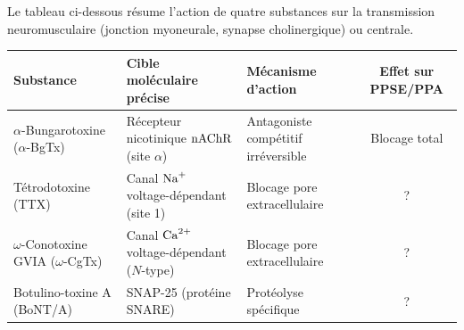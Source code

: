 \documentclass[11pt]{article}
\begin{document}
\begin{exercice}
Le tableau ci-dessous résume l'action de quatre substances sur la transmission neuromusculaire (jonction myoneurale, synapse cholinergique) ou centrale.

\begin{center}
\begin{tabular}{|l|l|l|c|}
\hline
\textbf{Substance} & \textbf{Cible moléculaire précise} & \textbf{Mécanisme d'action} & \textbf{Effet sur PPSE/PPA} \\
\hline
$\alpha$-Bungarotoxine ($\alpha$-BgTx) & Récepteur nicotinique $\ce{nAChR}$ (site $\alpha$) & Antagoniste compétitif irréversible & Blocage total \\
Tétrodotoxine (TTX) & Canal $\ce{Na+}$ voltage-dépendant (site 1) & Blocage pore extracellulaire & ? \\
$\omega$-Conotoxine GVIA ($\omega$-CgTx) & Canal $\ce{Ca^{2+}}$ voltage-dépendant ($N$-type) & Blocage pore extracellulaire & ? \\
Botulino-toxine A (BoNT/A) & SNAP-25 (protéine SNARE) & Protéolyse spécifique & ? \\
\hline
\end{tabular}
\end{center}


\end{exercice}
\end{document}

